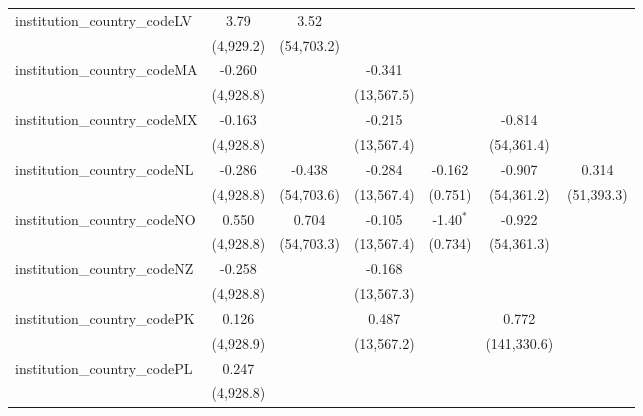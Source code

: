 \begin{tabular}{lcccccc}
   institution\_country\_codeLV          & 3.79          & 3.52        &               &              &              &   \\   
                                         & (4,929.2)     & (54,703.2)  &               &              &              &   \\   
   institution\_country\_codeMA          & -0.260        &             & -0.341        &              &              &   \\   
                                         & (4,928.8)     &             & (13,567.5)    &              &              &   \\   
   institution\_country\_codeMX          & -0.163        &             & -0.215        &              & -0.814       &   \\   
                                         & (4,928.8)     &             & (13,567.4)    &              & (54,361.4)   &   \\   
   institution\_country\_codeNL          & -0.286        & -0.438      & -0.284        & -0.162       & -0.907       & 0.314\\   
                                         & (4,928.8)     & (54,703.6)  & (13,567.4)    & (0.751)      & (54,361.2)   & (51,393.3)\\   
   institution\_country\_codeNO          & 0.550         & 0.704       & -0.105        & -1.40$^{*}$  & -0.922       &   \\   
                                         & (4,928.8)     & (54,703.3)  & (13,567.4)    & (0.734)      & (54,361.3)   &   \\   
   institution\_country\_codeNZ          & -0.258        &             & -0.168        &              &              &   \\   
                                         & (4,928.8)     &             & (13,567.3)    &              &              &   \\   
   institution\_country\_codePK          & 0.126         &             & 0.487         &              & 0.772        &   \\   
                                         & (4,928.9)     &             & (13,567.2)    &              & (141,330.6)  &   \\   
   institution\_country\_codePL          & 0.247         &             &               &              &              &   \\   
                                         & (4,928.8)     &             &               &              &              &   \\   

\end{tabular}
